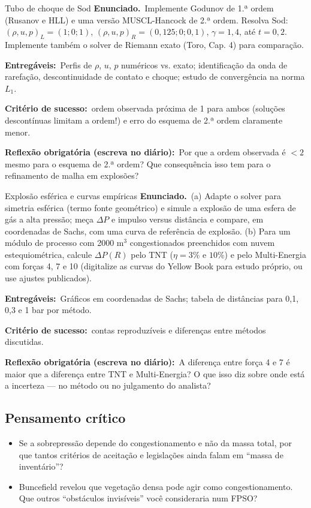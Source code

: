 \documentclass[10pt,a4paper,twocolumn,openany]{report}
\newenvironment{critico}{\subsection*{\textcolor{roxo}{Pensamento crítico}}}{\par}
\newcommand{\enunciado}{\noindent\textbf{Enunciado.}\ }
\newcommand{\entregaveis}{\par\medskip\noindent\textbf{Entregáveis:}}
\newcommand{\criterio}{\par\medskip\noindent\textbf{Critério de sucesso:}\ }
\newcommand{\reflexao}{\par\medskip\noindent\textbf{Reflexão obrigatória (escreva no diário):}}
\begin{document}
\begin{tarefa}{Tubo de choque de Sod}
\enunciado Implemente Godunov de 1.ª ordem (Rusanov e HLL) e uma versão
MUSCL-Hancock de 2.ª ordem. Resolva Sod: $(\rho,u,p)_L=(1;0;1)$,
$(\rho,u,p)_R=(0{,}125;0;0{,}1)$, $\gamma=1{,}4$, até $t=0{,}2$. Implemente
também o solver de Riemann exato (Toro, Cap. 4) para comparação.
\entregaveis\ Perfis de $\rho$, $u$, $p$ numéricos vs. exato; identificação
da onda de rarefação, descontinuidade de contato e choque; estudo de
convergência na norma $L_1$.
\criterio ordem observada próxima de 1 para ambos (soluções descontínuas
limitam a ordem!) e erro do esquema de 2.ª ordem claramente menor.
\reflexao\ Por que a ordem observada é $<2$ mesmo para o esquema de 2.ª
ordem? Que consequência isso tem para o refinamento de malha em explosões?
\end{tarefa}

\begin{tarefa}{Explosão esférica e curvas empíricas}
\enunciado (a) Adapte o solver para simetria esférica (termo fonte
geométrico) e simule a explosão de uma esfera de gás a alta pressão; meça
$\Delta P$ e impulso versus distância e compare, em coordenadas de Sachs,
com uma curva de referência de explosão. (b) Para um módulo de processo com
2000 m$^3$ congestionados preenchidos com nuvem estequiométrica, calcule
$\Delta P(R)$ pelo TNT ($\eta=3\%$ e $10\%$) e pelo Multi-Energia com forças
4, 7 e 10 (digitalize as curvas do Yellow Book para estudo próprio, ou use
ajustes publicados).
\entregaveis\ Gráficos em coordenadas de Sachs; tabela de distâncias para
0,1, 0,3 e 1 bar por método.
\criterio contas reproduzíveis e diferenças entre métodos discutidas.
\reflexao\ A diferença entre força 4 e 7 é maior que a diferença entre TNT
e Multi-Energia? O que isso diz sobre onde está a incerteza --- no método ou
no julgamento do analista?
\end{tarefa}

\begin{critico}
\begin{itemize}
  \item Se a sobrepressão depende do congestionamento e não da massa total,
        por que tantos critérios de aceitação e legislações ainda falam em
        ``massa de inventário''?
  \item Buncefield revelou que vegetação densa pode agir como
        congestionamento. Que outros ``obstáculos invisíveis'' você
        consideraria num FPSO?
\end{itemize}
\end{critico}
\end{document}
